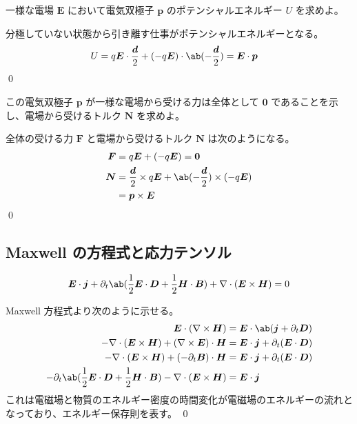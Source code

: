 \documentclass[uplatex,dvipdfmx,a4paper,11pt]{jlreq}
\makeatletter
\newcommand{\EE}{\bm{E}}
\newcommand{\DD}{\bm{D}}
\newcommand{\BB}{\bm{B}}
\newcommand{\HH}{\bm{H}}
\newcommand{\pp}{\bm{p}}
\newcommand{\vnabla}{\mathbf{\nabla}}
\numberwithin{equation}{section}
\theoremstyle{definition}
\renewenvironment{proof}[1][\proofname]{\par
  \normalfont
  \topsep6\p@\@plus6\p@ \trivlist
  \item[\hskip\labelsep{\bfseries #1}\@addpunct{\bfseries}]\ignorespaces\quad\par
}{%
  \qed\endtrivlist\@endpefalse
}
\renewcommand\proofname{証明}
\makeatother
\begin{document}
\begin{problem}
一様な電場 $\EE$ において電気双極子 $\pp$ のポテンシャルエネルギー $U$ を求めよ。
\end{problem}
\begin{proof}
  分極していない状態から引き離す仕事がポテンシャルエネルギーとなる。
  \begin{align}
    U & = q\bm{E}\cdot\frac{\bm{d}}{2} + (-q\bm{E})\cdot\ab(-\frac{\bm{d}}{2}) = \EE\cdot\pp
  \end{align}
\end{proof}

\begin{problem}
この電気双極子 $\bm{p}$ が一様な電場から受ける力は全体として $\bm{0}$ であることを示し、電場から受けるトルク $\bm{N}$ を求めよ。
\end{problem}
\begin{proof}
  全体の受ける力 $\bm{F}$ と電場から受けるトルク $\bm{N}$ は次のようになる。
  \begin{align}
    \bm{F} & = q\EE + (-q\EE) = \bm{0}                                           \\
    \bm{N} & = \frac{\bm{d}}{2}\times q\EE + \ab(-\frac{\bm{d}}{2})\times(-q\EE) \\
           & = \pp\times\EE
  \end{align}
\end{proof}


\subsection{Maxwell の方程式と応力テンソル}
\begin{problem}
\begin{align}
  \EE\cdot\bm{j} + \partial_t\ab(\frac{1}{2}\EE\cdot\DD + \frac{1}{2}\HH\cdot\BB) + \vnabla\cdot(\EE\times\HH) = 0
\end{align}
\end{problem}
\begin{proof}
  Maxwell 方程式より次のように示せる。
  \begin{align}
    \EE \cdot (\vnabla\times\HH)                                                                 & = \EE\cdot\ab(\bm{j} + \partial_t\DD)      \\
    -\vnabla\cdot(\EE\times\HH) + (\vnabla\times\EE)\cdot\HH                                     & = \EE\cdot\bm{j} + \partial_t(\EE\cdot\DD) \\
    -\vnabla\cdot(\EE\times\HH) + (-\partial_t\BB)\cdot\HH                                       & = \EE\cdot\bm{j} + \partial_t(\EE\cdot\DD) \\
    -\partial_t\ab(\frac{1}{2}\EE\cdot\DD + \frac{1}{2}\HH\cdot\BB) - \vnabla\cdot(\EE\times\HH) & = \EE\cdot\bm{j}
  \end{align}
  これは電磁場と物質のエネルギー密度の時間変化が電磁場のエネルギーの流れとなっており、エネルギー保存則を表す。
\end{proof}
\end{document}
